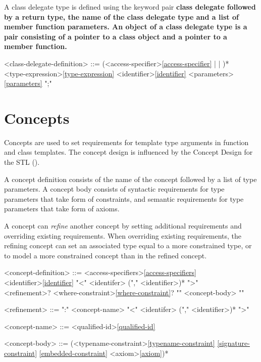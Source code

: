 \documentclass[a4paper,oneside,11pt]{article}
\begin{document}
A class delegate type is defined using the keyword pair \bf{class} \bf{delegate} followed by a return type, the name of the
class delegate type and a list of member function parameters.
An object of a class delegate type is a pair consisting of a pointer to a class object and a pointer to a member function.

\begin{grammar}
\label{class-delegate-definition}<class-delegate-definition> ::= (<access-specifier>\ref{access-specifier} |  | )*  \\
<type-expression>\ref{type-expression} <identifier>\ref{identifier} <parameters>\ref{parameters} ";"
\end{grammar}

\section{Concepts}

Concepts are used to set requirements for template type arguments in function and class templates.
The concept design is influenced by the Concept Design for the STL (\cite{STLCONCEPTS}).

A concept definition consists of the name of the concept followed by a list of type parameters.
A concept body consists of syntactic requirements for type parameters that take form of constraints,
and semantic requirements for type parameters that take form of axioms.

A concept can \emph{refine} another concept by setting additional requirements and overriding existing requirements.
When overriding existing requirements, the refining concept can set an associated type equal to a more constrained type,
or to model a more constrained concept than in the refined concept.

\begin{grammar}
\label{concept-definition}<concept-definition> ::= <access-specifiers>\ref{access-specifiers}\\
 <identifier>\ref{identifier} "<" <identifer> ("," <identifier>)* ">"\\
<refinement>? <where-constraint>\ref{where-constraint}? "{" <concept-body> "}"

<refinement> ::= ":" <concept-name> "<" <identifer> ("," <identifier>)* ">"

\label{concept-name}<concept-name> ::= <qualified-id>\ref{qualified-id}

<concept-body> ::= (<typename-constraint>\ref{typename-constraint}
\ref{signature-constraint}
\ref{embedded-constraint}
\alt <axiom>\ref{axiom})*
\end{grammar}
\end{document}
